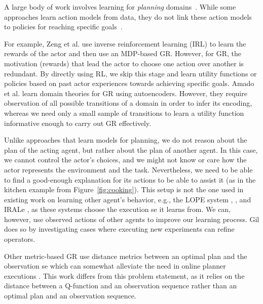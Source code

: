 \documentclass[letterpaper]{article} %
\begin{document}
A large body of work involves learning for \textit{planning} domains~\cite{zimmerman2003learning,arora2018review}.
While some approaches learn action models from data, they do not link these action models to policies for reaching specific goals~\cite{amir2008learning,amado2019latrec,asai2020learning,juba2021safe}.

For example, Zeng et al.  use inverse reinforcement learning (IRL) to learn the rewards of the actor and then use an MDP-based GR.
However, for GR, the motivation (rewards) that lead the actor to choose one action over another is redundant.
By directly using RL, we skip this stage and learn utility functions or policies based on past actor experiences towards achieving specific goals.
Amado et al.  learn domain theories for GR using autoencoders.
However, they require observation of all possible transitions of a domain in order to infer its encoding, whereas we need only a small sample of transitions to learn a utility function informative enough to carry out GR effectively.

Unlike approaches that learn models for planning, we do not reason about the plan of the acting agent, but rather about the plan of another agent.
In this case, we cannot control the actor's choices, and we might not know or care how the actor represents the environment and the task.
Nevertheless, we need to be able to find a good-enough explanation for its actions to be able to assist it (as in the kitchen example from Figure~\ref{fig:cooking}).
This setup is not the one used in existing work on learning other agent's behavior, e.g., the LOPE system \cite{garcia2000integrated}, \cite{safaei2007incremental}, and IRALe \cite{rodrigues2011active}, as these systems choose the execution se it learns from.
We can, however, use observed actions of other agents to improve our learning process.
Gil  does so by investigating cases where executing new experiments can refine operators.

Other metric-based GR use distance metrics between an optimal plan and the observation se which can somewhat alleviate the need in online planner executions \cite{masters2017cost,mirsky2019new}. This work differs from this problem statement, as it relies on the distance between a Q-function and an observation sequence rather than an optimal plan and an observation sequence.
\end{document}

